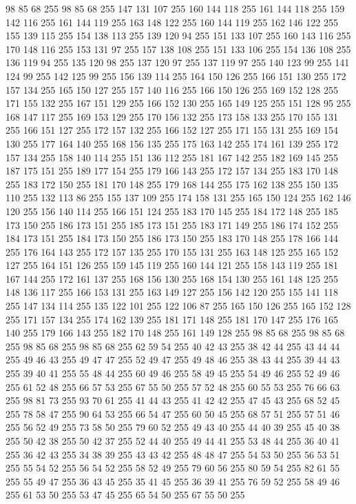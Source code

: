 98 85 68 255 98 85 68 255 147 131 107 255 160 144 118 255 161 144 118 255 159 142 116 255 161 144 119 255 163 148 122 255 160 144 119 255 162 146 122 255 155 139 115 255 154 138 113 255 139 120 94 255 151 133 107 255 160 143 116 255 170 148 116 255 153 131 97 255 157 138 108 255 151 133 106 255 154 136 108 255 136 119 94 255 135 120 98 255 137 120 97 255 137 119 97 255 140 123 99 255 141 124 99 255 142 125 99 255 156 139 114 255 164 150 126 255 166 151 130 255 172 157 134 255 165 150 127 255 157 140 116 255 166 150 126 255 169 152 128 255 171 155 132 255 167 151 129 255 166 152 130 255 165 149 125 255 151 128 95 255 168 147 117 255 169 153 129 255 170 156 132 255 173 158 133 255 170 155 131 255 166 151 127 255 172 157 132 255 166 152 127 255 171 155 131 255 169 154 130 255 177 164 140 255 168 156 135 255 175 163 142 255 174 161 139 255 172 157 134 255 158 140 114 255 151 136 112 255 181 167 142 255 182 169 145 255 187 175 151 255 189 177 154 255 179 166 143 255 172 157 134 255 183 170 148 255
183 172 150 255 181 170 148 255 179 168 144 255 175 162 138 255 150 135 110 255 132 113 86 255 155 137 109 255 174 158 131 255 165 150 124 255 162 146 120 255 156 140 114 255 166 151 124 255 183 170 145 255 184 172 148 255 185 173 150 255 186 173 151 255 185 173 151 255 183 171 149 255 186 174 152 255 184 173 151 255 184 173 150 255 186 173 150 255 183 170 148 255 178 166 144 255 176 164 143 255 172 157 135 255 170 155 131 255 163 148 125 255 165 152 127 255 164 151 126 255 159 145 119 255 160 144 121 255 158 143 119 255 181 167 144 255 172 161 137 255 168 156 130 255 168 154 130 255 161 148 125 255 148 136 117 255 166 153 131 255 163 149 127 255 156 142 120 255 155 141 118 255 147 134 114 255 135 122 101 255 122 106 87 255 165 150 126 255 165 152 128 255 171 157 134 255 174 162 139 255 181 171 148 255 181 170 147 255 176 165 140 255 179 166 143 255 182 170 148 255 161 149 128 255 98 85 68 255 98 85 68 255 98 85 68 255 98 85 68 255 62 59 54 255 40 42 43 255 38 42 44 255 43 44 44 255
49 46 43 255 49 47 47 255 52 49 47 255 49 48 46 255 38 43 44 255 39 44 43 255 39 40 41 255 55 48 44 255 60 49 46 255 58 49 45 255 54 49 46 255 52 49 46 255 61 52 48 255 66 57 53 255 67 55 50 255 57 52 48 255 60 55 53 255 76 66 63 255 98 81 73 255 93 70 61 255 41 44 43 255 41 42 42 255 47 45 43 255 68 52 45 255 78 58 47 255 90 64 53 255 66 54 47 255 60 50 45 255 68 57 51 255 57 51 46 255 56 52 49 255 73 58 50 255 79 60 52 255 49 43 40 255 44 40 39 255 45 40 38 255 50 42 38 255 50 42 37 255 52 44 40 255 49 44 41 255 53 48 44 255 36 40 41 255 36 42 43 255 34 38 39 255 43 43 42 255 48 48 47 255 54 53 50 255 56 53 51 255 55 54 52 255 56 54 52 255 58 52 49 255 79 60 56 255 80 59 54 255 82 61 55 255 55 49 47 255 36 43 45 255 35 41 45 255 36 39 41 255 76 59 52 255 58 49 46 255 61 53 50 255 53 47 45 255 65 54 50 255 67 55 50 255
